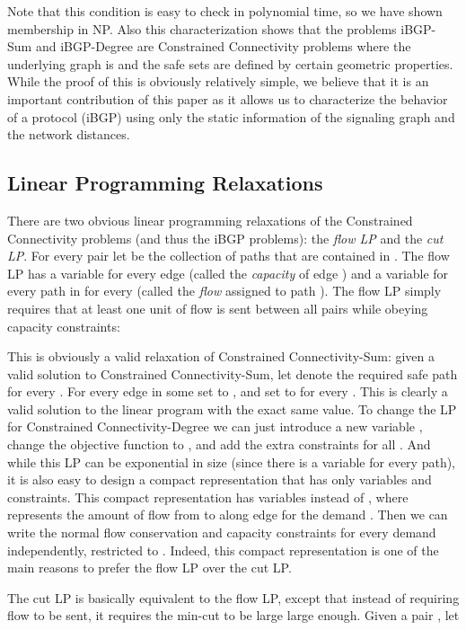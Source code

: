 \documentclass[11pt,letterpaper]{article}
\theoremstyle{definition}
\newcounter{note}[section]
\begin{document}
Note that this condition is easy to check in polynomial time, so we
have shown membership in NP.
Also this characterization shows that the problems
{\sc iBGP-Sum} and {\sc iBGP-Degree} are Constrained Connectivity
problems where the underlying graph  is  and the safe sets are defined by certain geometric properties.  While the proof of this is obviously relatively simple, we believe that it is an important contribution of this paper as it allows us to characterize the behavior of a protocol (iBGP) using only the static information of the signaling graph and the network distances.

\subsection{Linear Programming Relaxations}

There are two obvious linear programming relaxations of the {\sc
  Constrained Connectivity} problems (and thus the iBGP problems): the \emph{flow LP} and the
\emph{cut LP}.  For every pair  let
 be the collection of  paths that are contained
in .  The flow LP has a variable  for every edge  (called the \emph{capacity} of edge ) and a variable  for
every  path in  for every  (called the \emph{flow} assigned to path ).  The flow LP simply
requires that at least one unit of flow is sent between all pairs
while obeying capacity constraints:


 This is obviously a valid relaxation of {\sc
  Constrained Connectivity-Sum}: given a valid solution to
{\sc Constrained Connectivity-Sum}, let  denote the required
safe  path for every .  For every edge 
in some  set  to , and set  to  for
every .  This is clearly a valid
solution to the linear program with the exact same value.  To change
the LP for {\sc Constrained Connectivity-Degree} we can just introduce
a new variable , change the objective function to , and add the extra constraints  for all .  And while this LP can be exponential in size (since there is a variable for every path), it is also easy to design a compact representation that has only  variables and constraints.  This compact representation has variables  instead of , where  represents the amount of flow from  to  along edge  for the demand .    Then we can write the normal flow conservation and capacity constraints for every demand  independently, restricted to .  Indeed, this compact representation is one of the main reasons to prefer the flow LP over the cut LP.

The cut LP is basically equivalent to the flow LP, except that instead of requiring flow to be sent, it requires the min-cut to be large large enough. Given a pair , let
\end{document}
